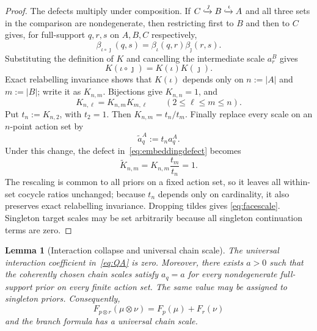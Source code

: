 \documentclass[11pt,a4paper]{article}
\newtheorem{lemma}[theorem]{Lemma}
\theoremstyle{definition}
\newcommand{\1}{\mathbf 1}
\begin{document}
\begin{proof}
The defects multiply under composition.  If
$C\xhookrightarrow{\jmath}B\xhookrightarrow{\iota}A$ and all three sets in the comparison are nondegenerate, then
restricting first to $B$ and then to $C$ gives, for full-support $q,r,s$ on $A,B,C$ respectively,
\[
\beta_{\iota\circ\jmath}(q,s)=\beta_\iota(q,r)\beta_\jmath(r,s).
\]
Substituting the definition of $K$ and cancelling the intermediate scale $a_r^B$ gives
\begin{equation}
K(\iota\circ\jmath)=K(\iota)K(\jmath).
\tag{KC}\label{eq:embeddingcocycle}
\end{equation}
Exact relabelling invariance shows that $K(\iota)$ depends only on $n:=|A|$ and $m:=|B|$; write it as $K_{n,m}$.
Bijections give $K_{n,n}=1$, and
\[
K_{n,\ell}=K_{n,m}K_{m,\ell}
\qquad(2\le\ell\le m\le n).
\]
Put $t_n:=K_{n,2}$, with $t_2=1$.  Then $K_{n,m}=t_n/t_m$.  Finally replace every scale on an $n$-point action set by
\[
\widetilde a_q^A:=t_n a_q^A.
\]
Under this change, the defect in~\eqref{eq:embeddingdefect} becomes
\[
\widetilde K_{n,m}=K_{n,m}\frac{t_m}{t_n}=1.
\]
The rescaling is common to all priors on a fixed action set, so it leaves all within-set cocycle ratios unchanged; because
$t_n$ depends only on cardinality, it also preserves exact relabelling invariance.  Dropping tildes gives
\eqref{eq:facescale}.  Singleton target scales may be set arbitrarily because all singleton continuation terms are zero.
\end{proof}

\begin{lemma}[Interaction collapse and universal chain scale]\label{lem:scalecoherence}
The universal interaction coefficient in~\eqref{eq:QA} is zero.  Moreover, there exists $a>0$ such that the coherently
chosen chain scales satisfy $a_q=a$ for every nondegenerate full-support prior on every finite action set.  The same
value may be assigned to singleton priors.  Consequently,
\begin{equation}
F_{p\otimes r}(\mu\otimes\nu)=F_p(\mu)+F_r(\nu)
\tag{PA}\label{eq:PArecovered}
\end{equation}
and the branch formula has a universal chain scale.
\end{lemma}
\end{document}
